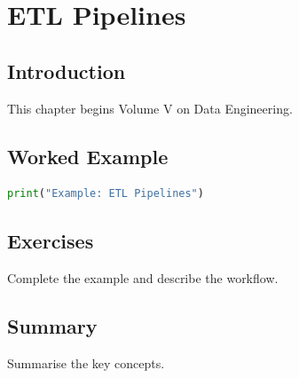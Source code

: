 \chapter{ETL Pipelines}
\label{chap:vol5-5}



\section{Introduction}
This chapter begins Volume V on Data Engineering.

\section{Worked Example}
\begin{lstlisting}[language=Python]
print("Example: ETL Pipelines")
\end{lstlisting}

\section{Exercises}
\begin{exercise}
Complete the example and describe the workflow.
\end{exercise}

\section{Summary}
Summarise the key concepts.
